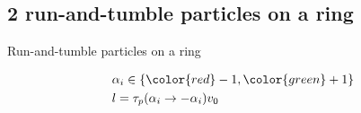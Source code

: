\documentclass{beamer}
\begin{document}
\subsection{2 run-and-tumble particles on a ring}

\begin{frame}{Run-and-tumble particles on a ring}


\begin{figure}
\centering

\end{figure}

\begin{eqnarray}
& \alpha_i \in \{{\color{red} -1}, {\color{green} +1}\}\\
& l = \tau_p(\alpha_i \to -\alpha_i) v_0
\end{eqnarray}

%

\end{frame}
\end{document}
